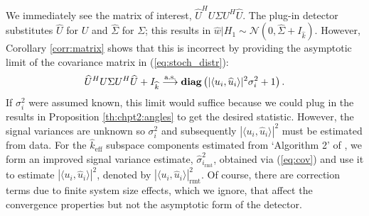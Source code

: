 We immediately see the matrix of interest, $\widehat{U}^HU\Sigma U^H\widehat{U}$. The plug-in detector substitutes $\widehat{U}$ for $U$ and $\widehat{\Sigma}$ for $\Sigma$; this results in $\widehat{w}|H_1\sim\mathcal{N}(0,\widehat{\Sigma} +I_{\widehat{k}})$. However, Corollary \ref{corr:matrix} shows that this is incorrect by providing the asymptotic limit of the covariance matrix in (\ref{eq:stoch_distr}):
\begin{equation}\label{eq:cov mat}
\widehat{U}^HU\Sigma U^H\widehat{U}+I_{\widehat{k}} \convas \diag\left(|\langle u_i,\widehat{u}_i\rangle|^2\sigma_i^2 + 1\right).
\end{equation}
If $\sigma_i^{2}$ were assumed known, this limit would suffice because we could plug in the results in Proposition \ref{th:chpt2:angles} to get the desired statistic. However, the signal variances are unknown so $\sigma_i^2$ and subsequently $|\langle u_i,\widehat{u}_i\rangle|^2$ must be estimated from data. For the $\widehat{k}_{\text{eff}}$ subspace components estimated from `Algorithm 2' of \cite{nadakuditi2010fundamental}, we form an improved signal variance estimate, $\widehat{\sigma}_{i_\text{rmt}}^2$,  obtained via (\ref{eq:cov}) and use it to estimate $|\langle u_i,\widehat{u}_i\rangle|^2$, denoted by $|\langle u_i,\widehat{u}_i\rangle|^2_\text{rmt}$. Of course, there are correction terms due to finite system size effects, which we ignore, that affect the convergence properties but not the asymptotic form of the detector.

